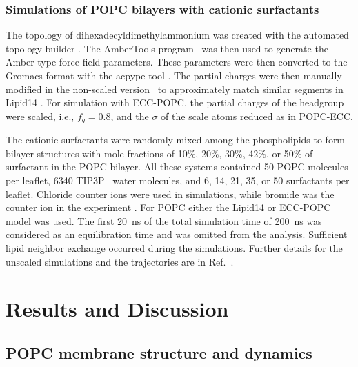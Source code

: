 \documentclass[aip,jcp,twocolumn]{revtex4}
\begin{document}
\subsubsection{Simulations of POPC bilayers with cationic surfactants}
The topology of dihexadecyldimethylammonium was created with the automated topology builder \cite{malde11}. The AmberTools program~\cite{amber} was then used to generate the Amber-type force field parameters. These parameters were then converted to the Gromacs format with the acpype tool \cite{acpype}. The partial charges were then manually modified in the non-scaled version~\cite{catte16} to approximately match similar segments in Lipid14 \cite{dickson14}. For simulation with ECC-POPC, the partial charges of the headgroup were scaled, i.e., $f_q=0.8$, and the $\sigma$ of the scale atoms reduced as in POPC-ECC.

The cationic surfactants were randomly mixed among the phospholipids to form bilayer structures with mole fractions of 10\%, 20\%, 30\%, 42\%, or 50\% of surfactant in the POPC bilayer. All these systems contained 50 POPC molecules per leaflet, 6340 TIP3P~\cite{jorgensen83} water molecules, and 6, 14, 21, 35, or 50 surfactants per leaflet.  Chloride counter ions were used in simulations, while bromide was the counter ion in the experiment \cite{scherer89}. For POPC either the Lipid14 or ECC-POPC model was used. The first 20~ns of the total simulation time of 200~ns was considered as an equilibration time and was omitted from the analysis. Sufficient lipid neighbor exchange occurred during the simulations. Further details for the unscaled simulations and the trajectories are in Ref.~.


\section{Results and Discussion}

\subsection{POPC membrane structure and dynamics}
\end{document}
